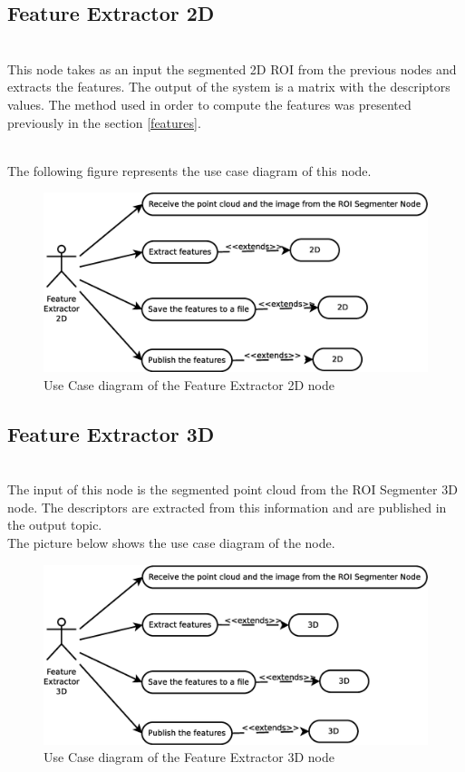 \subsection{Feature Extractor 2D}\\
	This node takes as an input the segmented 2D ROI from the previous nodes and extracts the features. The output of the system is a matrix with the descriptors values. The method used in order to compute the features was presented previously in the section  \ref{features}.

	\\

	The following figure represents the use case diagram of this node. 
	\begin{figure}[H]
		\centering
			\includegraphics[scale=0.4]{img/diagrams/uc_feature_extractor_2d.eps}
			\caption[Use case diagram Feature Extractor 2D node]{Use Case diagram of the Feature Extractor 2D node}
		
	\end{figure}

\subsection{Feature Extractor 3D}\\
	The input of this node is the segmented point cloud from the ROI Segmenter 3D node. The descriptors are extracted from this information and are published in the output topic. 
	\\

	The picture below shows the use case diagram of the node. 

	\begin{figure}[H]
		\centering
			\includegraphics[scale=0.4]{img/diagrams/uc_feature_extractor_3d.eps}
			\caption[Use case diagram Feature Extractor 3D node]{Use Case diagram of the Feature Extractor 3D node}
		
	\end{figure}

